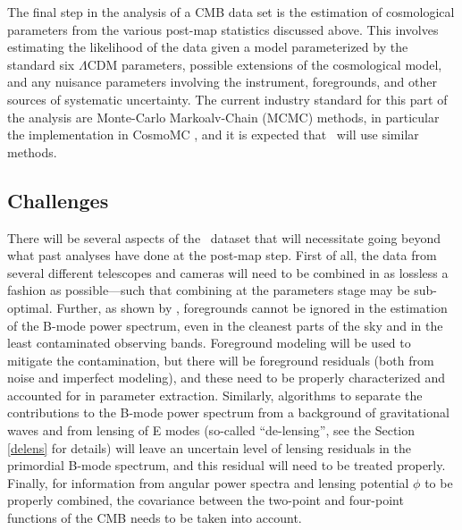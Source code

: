 The final step in the analysis of a CMB data set is the estimation of cosmological parameters from
the various post-map statistics discussed above.
This involves estimating the likelihood of the data
given a model parameterized by the standard six $\Lambda$CDM parameters, possible extensions
of the cosmological model, and any nuisance parameters involving the instrument, foregrounds, and
other sources of systematic uncertainty. The current industry standard for this part of the analysis are
Monte-Carlo Markoalv-Chain (MCMC) methods, in particular the implementation in CosmoMC
\cite{Lewis:2002ah}, and it is expected that \cmbexp\ will use similar methods. 

\subsection{Challenges}
\label{se:challenges}
There will be several 
aspects of the \cmbexp\ dataset that will necessitate going beyond what past analyses
have done at the post-map step. First of all, the data from several different telescopes and cameras will need
to be combined in as lossless a fashion as possible---such that combining at the parameters stage
may be sub-optimal.
Further, as shown by \cite{Ade:2015tva}, foregrounds cannot be ignored in the 
estimation of the B-mode power spectrum, even in the cleanest parts of the sky and in the 
least contaminated observing bands. Foreground modeling will be used to mitigate the contamination,
but there will be foreground residuals (both from noise and imperfect modeling), and these need
to be properly characterized and accounted for in parameter extraction. 
Similarly, algorithms to separate the contributions to the B-mode power spectrum from a background of gravitational
waves and from lensing of E modes (so-called ``de-lensing'', see the Section \ref{delens} for 
details) will leave an uncertain level of lensing residuals in the primordial B-mode spectrum, and
this residual will need to be treated properly. Finally, for information from angular power spectra
and lensing potential $\phi$ to be properly combined, the covariance between the two-point and
four-point functions of the CMB needs to be taken into account.

